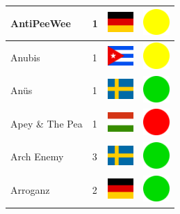 \documentclass[12pt, a4paper, twoside]{report}
\begin{document}
\begin{center}
\begin{longtable}{|p{5cm}|p{2cm}|p{2cm}|p{2cm}|}
			AntiPeeWee & 1 & \includegraphics[width=1cm]{4x3/de} & \includegraphics[width=1cm]{likes/m} \\ \hline
			Anubis & 1 & \includegraphics[width=1cm]{4x3/cu} & \includegraphics[width=1cm]{likes/m} \\ \hline
			Anüs & 1 & \includegraphics[width=1cm]{4x3/se} & \includegraphics[width=1cm]{likes/y} \\ \hline
			Apey \& The Pea & 1 & \includegraphics[width=1cm]{4x3/hu} & \includegraphics[width=1cm]{likes/n} \\ \hline
			Arch Enemy & 3 & \includegraphics[width=1cm]{4x3/se} & \includegraphics[width=1cm]{likes/y} \\ \hline
			Arroganz & 2 & \includegraphics[width=1cm]{4x3/de} & \includegraphics[width=1cm]{likes/y} \\ \hline

\end{longtable}
\end{center}
\end{document}
